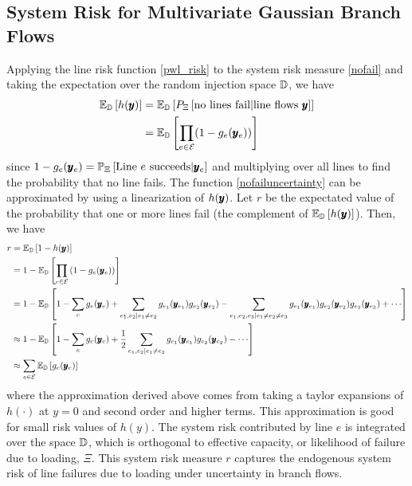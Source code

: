 \subsection{System Risk for Multivariate Gaussian Branch Flows}
Applying the line risk function \cref{pwl_risk} to the system risk measure \cref{nofail} and taking the expectation over the random injection space $\mathbb{D}$, we have
\begin{align}\label{nofailuncertainty}
  \mathbb{E}_{\mathbb{D}} \left[ h(\pmb{y}) \right]  &= \mathbb{E}_{\mathbb{D}} \left[ P_\Xi \left[ \mbox{no lines fail} | \mbox{line flows } \pmb{y}\right] \right]\\
  &= \mathbb{E}_{\mathbb{D}} \left[  \prod_{e \in \mathcal{E}} (1 - g_e(\pmb{y}_e) ) \right]
\end{align}
since $ 1- g_e(\pmb{y}_e) = \mathbb{P}_{\Xi} \left[ \text{Line }e\text{ succeeds} | \pmb{y}_e \right] $ and multiplying over all lines to find the probability that no line fails. The function \cref{nofailuncertainty} can be approximated by using a linearization of $h(\pmb{y})$.  Let $r$ be the expectated value of the probability that one or more lines fail (the complement of $\mathbb{E}_{\mathbb{D}} \left[ h(\pmb{y}) \right]$). Then, we have
\begin{align*}\label{linear}
r &= \E{\bD}{1 - h(\ry)}  \\
 &= 1 - \E{\bD}{\prod_{e \in \cE}\left( 1 - g_e(\hry_e)\right) } \\
  &= 1 - \E{\bD}{ 1 - \sum_e g_e(\ry_e) + \sum_{e_1,e_2|e_1\neq e_2} g_{e_1} (\ry_{e_1}) g_{e_2}(\ry_{e_2}) - \sum_{e_1,e_2,e_3|e_1\neq e_2 \neq e_3} g_{e_1} (\ry_{e_1}) g_{e_2}(\ry_{e_2}) g_{e_3} (\ry_{e_3}) + \cdots } \\
  & \approx 1 - \E{\bD}{ 1 - \sum_{e} g_e(\ry_e) + \frac{1}{2} \sum_{e_1,e_2|e_1\neq e_2} g_{e_1} (\ry_{e_1}) g_{e_2}(\ry_{e_2}) - \cdots } \\
 &\approx \sum_{e \in \cE} \E{\bD}{g_e(\hry_e)}
\end{align*}
where the approximation derived above comes from taking a taylor expansions of $h(\cdot)$ at $y=0$ and second order and higher terms.  This approximation is good for small risk values of $h(y)$.
The system risk contributed by line $e$ is integrated over the space $\mathbb{D}$, which is orthogonal to effective capacity, or likelihood of failure due to loading, $\Xi$.  This system risk measure $r$ captures the endogenous system risk of line failures due to loading under uncertainty in branch flows.

